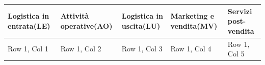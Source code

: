 \documentclass{article}
\begin{document}
\begin{tabularx}{\textwidth}{
    |>{\centering\arraybackslash}X
    |>{\centering\arraybackslash}X
    |>{\centering\arraybackslash}X
    |>{\centering\arraybackslash}X
    |>{\centering\arraybackslash}X|
  }
  \hline
  \textbf{Logistica in entrata(LE)} & \textbf{Attività operative(AO)} & \textbf{Logistica in uscita(LU)} & \textbf{Marketing e vendita(MV)} & \textbf{Servizi post-vendita} \\ 
  \hline
  Row 1, Col 1 & Row 1, Col 2 & Row 1, Col 3 & Row 1, Col 4 & Row 1, Col 5 \\
  \hline
\end{tabularx}








\printindex
\end{document}

